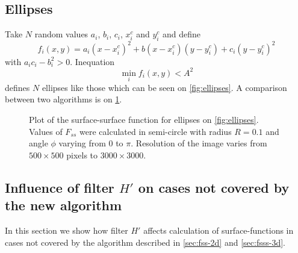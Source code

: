 \documentclass[reprint,amsmath,amssymb,aps,pre,showkeys,showpacs]{revtex4-1}
\begin{document}
\subsection{Ellipses}
\label{sec:ellipses}
Take $N$ random values $a_i$, $b_i$, $c_i$, $x^c_i$ and $y^c_i$ and define
\begin{equation*}
  f_i(x, y) = a_i(x-x^c_i)^2 + b(x-x^c_i)(y-y^c_i) + c_i(y-y^c_i)^2
\end{equation*}
with $a_ic_i - b_i^2 > 0$. Inequation
\begin{equation*}
  \min_i f_i(x, y) < A^2
\end{equation*}
defines $N$ ellipses like those which can be seen on \cref{fig:ellipses}. A
comparison between two algorithms is on \cref{fig:fss-ellipses}.
\begin{figure}[!hpt]
  \centering
  \hfill
  \caption[]{Plot of the surface-surface function for ellipses on
    \cref{fig:ellipses}. Values of $F_{ss}$ were calculated in semi-circle with
    radius $R = 0.1$ and angle $\phi$ varying from $0$ to $\pi$. Resolution of
    the image varies from $500\times 500$ pixels to $3000\times 3000$.}
  \label{fig:fss-ellipses}
\end{figure}

\subsection{Influence of filter $H'$ on cases not covered by the new algorithm}
In this section we show how filter $H'$ affects calculation of surface-functions
in cases not covered by the algorithm described in \cref{sec:fss-2d} and
\cref{sec:fsss-3d}.
\end{document}
